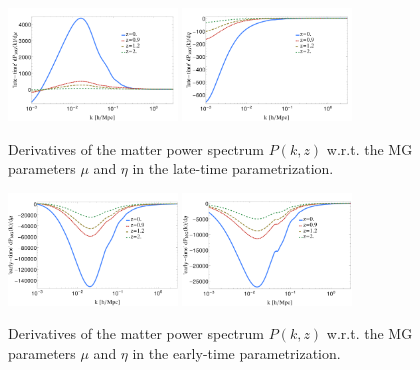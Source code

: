 \begin{figure}[htbp]
	\centering{}
	\includegraphics[width=0.4\textwidth]{Chapters/linear-nonlinear-MG-forecasts/figures/power-spectra/derivs/MGDE-Pk-wrt-mu-4z.pdf}
	\includegraphics[width=0.4\textwidth]{Chapters/linear-nonlinear-MG-forecasts/figures/power-spectra/derivs/MGDE-Pk-wrt-eta-4z.pdf}
	\caption[Derivatives of the power spectrum in the late-time parameterization.]{ Derivatives of the matter power spectrum $P(k,z)$ w.r.t. the MG parameters $\mu$ and $\eta$ in the late-time parametrization.
	}\label{fig:Pkderivs-latetime}
\end{figure}


\begin{figure}[htbp]
	\includegraphics[width=0.4\textwidth]{Chapters/linear-nonlinear-MG-forecasts/figures/power-spectra/derivs/MGTR-Pk-wrt-mu-4z.pdf}
	\includegraphics[width=0.4\textwidth]{Chapters/linear-nonlinear-MG-forecasts/figures/power-spectra/derivs/MGTR-Pk-wrt-eta-4z.pdf}
	\caption[Derivatives of the power spectrum in the early-time parameterization.]
	{ Derivatives of the matter power spectrum $P(k,z)$ w.r.t. the MG parameters $\mu$ and $\eta$ in the early-time parametrization.
	}\label{fig:Pkderivs-latetime}
\end{figure}

